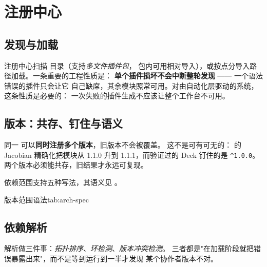 \section{注册中心}
\label{sec:arch-registry}

\subsection{发现与加载}

注册中心扫描  目录（支持\emph{多文件插件包}，
包内可用相对导入），或按点分导入路径加载。一条重要的工程性质是：
\textbf{单个插件损坏不会中断整轮发现} —— 一个语法错误的插件只会让它
自己缺席，其余模块照常可用。对由自动化层驱动的系统，这条性质是必要的：
一次失败的插件生成不应该让整个工作台不可用。

\subsection{版本：共存、钉住与语义}
\label{sec:arch-version}

同一  可以\textbf{同时注册多个版本}，旧版本不会被覆盖。
这不是可有可无的： 的 Jacobian 精确化把模块从
1.1.0 升到 1.1.1，而验证过的 Deck 钉住的是 \texttt{\^{}1.0.0}。
两个版本必须能共存，旧结果才永远可复现。

依赖范围支持五种写法，其语义见 。

\begin{veriftable}{版本范围语法}{tab:arch-spec}
\end{veriftable}

\subsection{依赖解析}

解析做三件事：\emph{拓扑排序}、\emph{环检测}、\emph{版本冲突检测}。
三者都是"在加载阶段就把错误暴露出来"，而不是等到运行到一半才发现
某个协作者版本不对。

